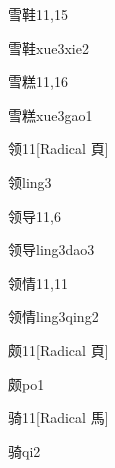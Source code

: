 \begin{entry}{雪鞋}{11,15}
  \begin{phonetics}{雪鞋}{xue3xie2}
  \end{phonetics}
\end{entry}

\begin{entry}{雪糕}{11,16}
  \begin{phonetics}{雪糕}{xue3gao1}
  \end{phonetics}
\end{entry}

\begin{entry}{领}{11}[Radical 頁]
  \begin{phonetics}{领}{ling3}
  \end{phonetics}
\end{entry}

\begin{entry}{领导}{11,6}
  \begin{phonetics}{领导}{ling3dao3}
  \end{phonetics}
\end{entry}

\begin{entry}{领情}{11,11}
  \begin{phonetics}{领情}{ling3qing2}
  \end{phonetics}
\end{entry}

\begin{entry}{颇}{11}[Radical 頁]
  \begin{phonetics}{颇}{po1}
  \end{phonetics}
\end{entry}

\begin{entry}{骑}{11}[Radical 馬]
  \begin{phonetics}{骑}{qi2}
  \end{phonetics}
\end{entry}

